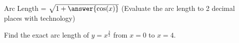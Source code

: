 \documentclass{ximera}
\begin{document}
\begin{problem}

Arc Length = $\sqrt{1+{\answer{\cos(x)}}}$ (Evaluate the arc length to 2 decimal places with technology)

\end{problem}

\begin{problem}

Find the exact arc length of $y = x^{\frac{3}{2}}$ from $x=0$ to $x=4$.


\end{problem}
\end{document}
